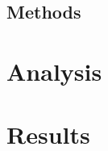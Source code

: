 \documentclass[12pt]{article}
\begin{document}
		\subsection{Methods}
	\section{Analysis}
	\section{Results}
	
\end{document}
